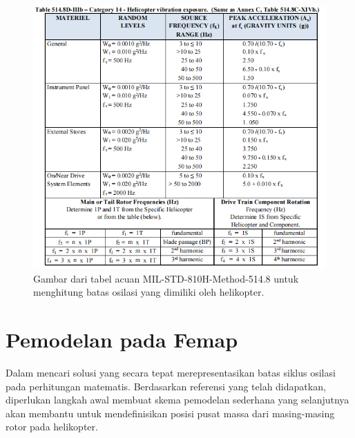 \begin{figure}[H]
	\centering
	\includegraphics[width=0.8\linewidth]{gambar/MIL_STD.png}
	\caption{Gambar dari tabel acuan MIL-STD-810H-Method-514.8 untuk menghitung batas osilasi yang dimiliki oleh helikopter.}
	\label{fig:MIL_STD}
\end{figure}


\section{Pemodelan pada Femap}
	\label{sec:femap}
Dalam mencari solusi yang secara tepat merepresentasikan batas siklus osilasi pada perhitungan matematis. Berdasarkan referensi yang telah didapatkan, diperlukan langkah awal membuat skema pemodelan sederhana yang selanjutnya akan membantu untuk mendefinisikan posisi pusat massa dari masing-masing rotor pada helikopter. 